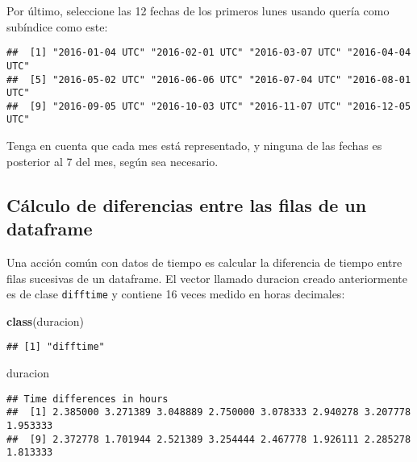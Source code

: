 \documentclass[]{article}
\newenvironment{Shaded}{\begin{snugshade}}{\end{snugshade}}
\newcommand{\KeywordTok}[1]{\textcolor[rgb]{0.13,0.29,0.53}{\textbf{#1}}}
\newcommand{\DecValTok}[1]{\textcolor[rgb]{0.00,0.00,0.81}{#1}}
\newcommand{\OperatorTok}[1]{\textcolor[rgb]{0.81,0.36,0.00}{\textbf{#1}}}
\newcommand{\NormalTok}[1]{#1}
\begin{document}
Por último, seleccione las 12 fechas de los primeros lunes usando quería
como subíndice como este:

\begin{Shaded}
\end{Shaded}

\begin{verbatim}
##  [1] "2016-01-04 UTC" "2016-02-01 UTC" "2016-03-07 UTC" "2016-04-04 UTC"
##  [5] "2016-05-02 UTC" "2016-06-06 UTC" "2016-07-04 UTC" "2016-08-01 UTC"
##  [9] "2016-09-05 UTC" "2016-10-03 UTC" "2016-11-07 UTC" "2016-12-05 UTC"
\end{verbatim}

Tenga en cuenta que cada mes está representado, y ninguna de las fechas
es posterior al 7 del mes, según sea necesario.

\subsection{Cálculo de diferencias entre las filas de un
dataframe}\label{cuxe1lculo-de-diferencias-entre-las-filas-de-un-dataframe}

Una acción común con datos de tiempo es calcular la diferencia de tiempo
entre filas sucesivas de un dataframe. El vector llamado duracion creado
anteriormente es de clase \texttt{difftime} y contiene 16 veces medido
en horas decimales:

\begin{Shaded}
\begin{Highlighting}[]
\KeywordTok{class}\NormalTok{(duracion)}
\end{Highlighting}
\end{Shaded}

\begin{verbatim}
## [1] "difftime"
\end{verbatim}

\begin{Shaded}
\begin{Highlighting}[]
\NormalTok{duracion}
\end{Highlighting}
\end{Shaded}

\begin{verbatim}
## Time differences in hours
##  [1] 2.385000 3.271389 3.048889 2.750000 3.078333 2.940278 3.207778 1.953333
##  [9] 2.372778 1.701944 2.521389 3.254444 2.467778 1.926111 2.285278 1.813333
\end{verbatim}
\end{document}
